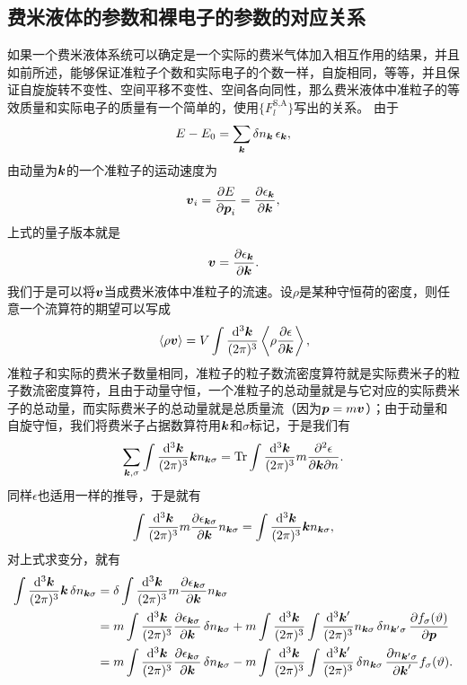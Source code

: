\subsection{费米液体的参数和裸电子的参数的对应关系}

如果一个费米液体系统可以确定是一个实际的费米气体加入相互作用的结果，并且如前所述，能够保证准粒子个数和实际电子的个数一样，自旋相同，等等，并且保证自旋旋转不变性、空间平移不变性、空间各向同性，那么费米液体中准粒子的等效质量和实际电子的质量有一个简单的，使用$\{F_l^\text{S,A}\}$写出的关系。
由于
\[
    E - E_0 = \sum_{\vb*{k}} \var{n_{\vb*{k}}} \epsilon_{\vb*{k}},
\]
由动量为$\vb*{k}$的一个准粒子的运动速度为
\[
    \vb*{v}_i = \pdv{E}{\vb*{p}_i} = \pdv{\epsilon_{\vb*{k}}}{\vb*{k}},
\]
上式的量子版本就是
\[
    {\vb*{v}} = \pdv{{\epsilon}_{\vb*{k}}}{\vb*{k}}.
\]
我们于是可以将${\vb*{v}}$当成费米液体中准粒子的流速。设$\rho$是某种守恒荷的密度，则任意一个流算符的期望可以写成
\[
    \begin{aligned}
        \expval*{\rho \vb*{v}} = V \int \frac{\dd[3]{\vb*{k}}}{(2\pi)^3} \expval{\rho \pdv{{\epsilon}}{\vb*{k}}} , 
    \end{aligned}
\]
准粒子和实际的费米子数量相同，准粒子的粒子数流密度算符就是实际费米子的粒子数流密度算符，且由于动量守恒，一个准粒子的总动量就是与它对应的实际费米子的总动量，而实际费米子的总动量就是总质量流（因为$\vb*{p}=m\vb*{v}$）；由于动量和自旋守恒，我们将费米子占据数算符用$\vb*{k}$和$\sigma$标记，于是我们有
\[
    \sum_{\vb*{k}, \sigma} \int \frac{\dd[3]{\vb*{k}}}{(2\pi)^3} \vb*{k} {n}_{\vb*{k} \sigma} = \Trace \int \frac{\dd[3]{\vb*{k}}}{(2\pi)^3} m \pdv{{\epsilon}}{\vb*{k}} {n}.
\]
同样${\epsilon}$也适用一样的推导，于是就有
\[
    \int \frac{\dd[3]{\vb*{k}}}{(2\pi)^3} m \pdv{\epsilon_{\vb*{k} \sigma}}{\vb*{k}} n_{\vb*{k} \sigma} = \int \frac{\dd[3]{\vb*{k}}}{(2\pi)^3} \vb*{k} n_{\vb*{k} \sigma},
\]
对上式求变分，就有
\[
    \begin{aligned}
        \int \frac{\dd[3]{\vb*{k}}}{(2\pi)^3} \vb*{k} \var{n_{\vb*{k} \sigma}} &= \var \int \frac{\dd[3]{\vb*{k}}}{(2\pi)^3} m \pdv{\epsilon_{\vb*{k} \sigma}}{\vb*{k}} n_{\vb*{k} \sigma} \\
        &= m \int \frac{\dd[3]{\vb*{k}}}{(2\pi)^3} \pdv{\epsilon_{\vb*{k} \sigma}}{\vb*{k}} \var{n_{\vb*{k} \sigma}} + m \int \frac{\dd[3]{\vb*{k}}}{(2\pi)^3} \int \frac{\dd[3]{\vb*{k}'}}{(2\pi)^3} n_{\vb*{k} \sigma} \var{n_{\vb*{k}' \sigma}} \pdv{f_{\sigma}(\vartheta)}{\vb*{p}} \\
        &= m \int \frac{\dd[3]{\vb*{k}}}{(2\pi)^3} \pdv{\epsilon_{\vb*{k} \sigma}}{\vb*{k}} \var{n_{\vb*{k} \sigma}} - m \int \frac{\dd[3]{\vb*{k}}}{(2\pi)^3} \int \frac{\dd[3]{\vb*{k}'}}{(2\pi)^3} \var{n_{\vb*{k} \sigma}} \pdv{n_{\vb*{k}' \sigma}}{\vb*{k}'} f_{\sigma}(\vartheta) .
    \end{aligned}
\]
